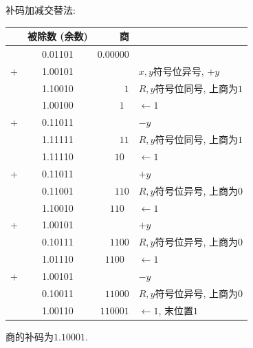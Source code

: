 \documentclass[UTF8]{report}
\newcommand{\la}{\leftarrow}
\newcommand{\spz}{\phantom{0}}
\newenvironment{solution}{{\noindent\hskip 2em \bf 解 \quad}}{}
\begin{document}
\begin{solution}
\begin{enumerate}
        补码加减交替法:
        \begin{tabular}{cc|r|l}
            & 被除数 (余数)   & 商    & \\
        \hline
            & 0.01101 &  $0.00000$ &   \\
        +& 1.00101 &         $ $ & $x,y$符号位异号, $+y$ \\
        \hline
            & 1.10010 &        $1 $ & $R,y$符号位同号, 上商为$1$ \\
            & 1.00100 &     $1\spz$ & $\la 1$ \\
        +& 0.11011 &         $ $ & $-y$ \\
        \hline
            & 1.11111 &       $11 $ & $R,y$符号位同号, 上商为$1$ \\
            & 1.11110 &    $10\spz$ & $\la 1$ \\
        +& 0.11011 &         $ $ & $+y$ \\
        \hline
            & 0.11001 &      $110 $ & $R,y$符号位异号, 上商为$0$ \\
            & 1.10010 &   $110\spz$ & $\la 1$ \\
        +& 1.00101 &         $ $ & $+y$ \\
        \hline
            & 0.10111 &     $1100 $ & $R,y$符号位异号, 上商为$0$ \\
            & 1.01110 &  $1100\spz$ & $\la 1$ \\
        +& 1.00101 &         $ $ & $-y$ \\
        \hline
            & 0.10011 &    $11000 $ & $R,y$符号位异号, 上商为$0$ \\
            & 1.00110 &   $110001 $ & $\la 1$, 末位置$1$ \\
        \end{tabular}

        商的补码为$1.10001$.


    \end{enumerate}
\end{solution}
\end{document}
